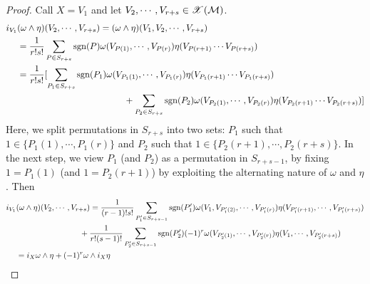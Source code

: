\documentclass[a4paper, 10pt]{article}
\begin{document}
\begin{proof}
     Call $X = V_{1}$ and let $V_{2},\cdots,V_{r+s} \in \mathscr{X}(\mathcal{M})$.
    \begin{align*}
        i_{V_{1}}&(\omega\wedge\eta)(V_{2},\cdots,V_{r+s}) = (\omega\wedge\eta)(V_{1},V_{2},\cdots,V_{r+s}) \\
        &= \frac{1}{r!s!}\sum_{P \in S_{r+s}} \mathrm{sgn}(P) \omega(V_{P(1)},\cdots,V_{P(r)}) \eta(V_{P(r+1)}\cdots V_{P(r+s)}) \\
        &= \frac{1}{r!s!} [ \sum_{P_{1}\in S_{r+s}} \mathrm{sgn}(P_{1}) \omega(V_{P_{1}(1)},\cdots,V_{P_{1}(r)}) \eta(V_{P_{1}(r+1)}\cdots V_{P_{1}(r+s)}) \\
        &\qquad\qquad\qquad\qquad\qquad\qquad + \sum_{P_{2}\in S_{r+s}} \mathrm{sgn}(P_{2}) \omega(V_{P_{2}(1)},\cdots,V_{P_{2}(r)}) \eta(V_{P_{2}(r+1)}\cdots V_{P_{2}(r+s)}) ]
    \end{align*}
    Here, we split permutations in $S_{r+s}$ into two sets: $P_{1}$ such that $1 \in \{P_{1}(1),\cdots,P_{1}(r)\}$ and $P_{2}$ such that $1 \in \{P_{2}(r+1),\cdots,P_{2}(r+s)\}$. In the next step, we view $P_{1}$ (and $P_{2}$) as a permutation in $S_{r+s-1}$, by fixing $1 = P_{1}(1)$ (and $1 = P_{2}(r+1)$) by exploiting the alternating nature of $\omega$ and $\eta$. Then
    \begin{align*}
        i_{V_{1}}&(\omega\wedge\eta)(V_{2},\cdots,V_{r+s}) = \frac{1}{(r-1)!s!}\sum_{P_{1}'\in S_{r+s-1}} \mathrm{sgn}(P_{1}')\omega(V_{1},V_{P_{1}'(2)},\cdots,V_{P_{1}'(r)}) \eta(V_{P_{1}'(r+1)},\cdots,V_{P_{1}'(r+s)}) \\
        &\qquad\qquad\qquad\qquad + \frac{1}{r!(s-1)!}\sum_{P_{2}'\in S_{r+s-1}}\mathrm{sgn}(P_{2}')(-1)^{r}\omega(V_{P_{2}'(1)},\cdots,V_{P_{2}'(r)})\eta(V_{1},\cdots,V_{P_{2}'(r+s)}) \\
        &= i_{X}\omega \wedge \eta + (-1)^{r}\omega \wedge i_{X}\eta
    \end{align*}
\end{proof}
\newpage

\end{document}

